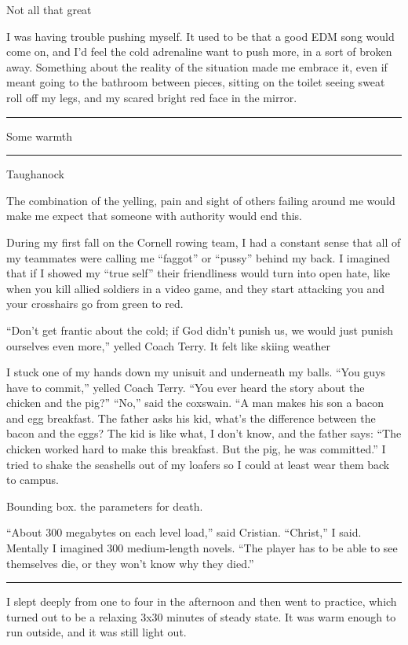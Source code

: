 Not all that great

I was having trouble pushing myself.  It used to be that a good EDM song would
come on, and I'd feel the cold adrenaline want to push more, in a sort of broken
away.  Something about the reality of the situation made me embrace it, even if
meant going to the bathroom between pieces, sitting on the toilet seeing sweat
roll off my legs, and my scared bright red face in the mirror.  


\plainfancybreak{12pt}{2}{* * *}

Some warmth

\plainfancybreak{12pt}{2}{* * *}

Taughanock

The combination of the yelling, pain and sight of others failing around me would
make me expect that someone with authority would end this.

During my first fall on the Cornell rowing team, I had a constant sense that
all of my teammates were calling me ``faggot'' or ``pussy'' behind my back.  I
imagined that if I showed my ``true self'' their friendliness would turn into
open hate, like when you kill allied soldiers in a video game, and they start
attacking you and your crosshairs go from green to red.  

``Don't get frantic about the cold; if God didn't punish us, we would just
punish ourselves even more,'' yelled Coach Terry.  It felt like skiing weather

I stuck one of my hands down my unisuit and underneath my balls.  ``You guys
have to commit,'' yelled Coach Terry.  ``You ever heard the story about the
chicken and the pig?'' ``No,'' said the coxswain.  ``A man makes his son a bacon
and egg breakfast.  The father asks his kid, what's the difference between the
bacon and the eggs?  The kid is like what, I don't know, and the father says:
``The chicken worked hard to make this breakfast.  But the pig, he was
committed.'' I tried to shake the seashells out of my loafers so I could at
least wear them back to campus. 

Bounding box.  the parameters for death.

``About 300 megabytes on each level load,'' said Cristian.  ``Christ,'' I said.
Mentally I imagined 300 medium-length novels.  ``The player has to be able to
see themselves die, or they won't know why they died.'' 

\plainfancybreak{12pt}{2}{* * *}

I slept deeply from one to four in the afternoon and then went to practice,
which turned out to be a relaxing 3x30 minutes of steady state.  It was warm
enough to run outside, and it was still light out.

